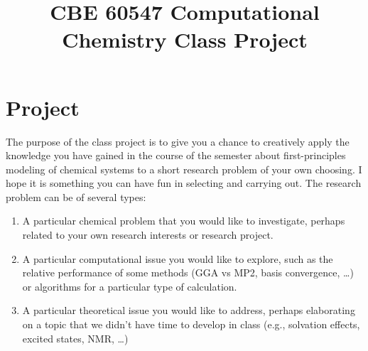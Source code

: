 \documentclass[11pt]{article}
\date{}
\title{}
\begin{document}
\title{CBE 60547 Computational Chemistry Class Project}
\maketitle

\section{Project}
\label{sec:orgd018a8a}
The purpose of the class project is to give you a chance to creatively apply the knowledge you have gained in the course of the semester about first-principles modeling of chemical systems to a short research problem of your own choosing.  I hope it is something you can have fun in selecting and carrying out.  The research problem can be of several types:

\begin{enumerate}
\item A particular chemical problem that you would like to investigate, perhaps related to your own research interests or research project.
\item A particular computational issue you would like to explore, such as the relative performance of some methods (GGA vs MP2, basis convergence, \ldots{}) or algorithms for a particular type of calculation.
\item A particular theoretical issue you would like to address, perhaps elaborating on a topic that we didn't have time to develop in class (e.g., solvation effects, excited states, NMR, \ldots{})
\end{enumerate}
\end{document}
